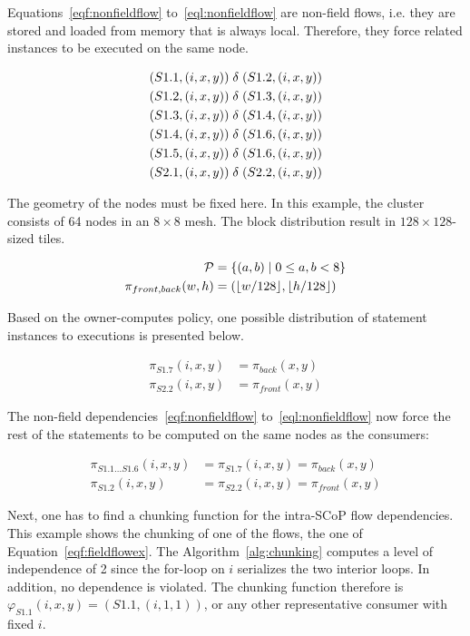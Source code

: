 \documentclass{sigplanconf}
\newcommand{\Proc}{{\cal P}}
\begin{document}
Equations~\ref{eqf:nonfieldflow} to~\ref{eql:nonfieldflow} are non-field flows, i.e. they are stored and loaded from memory that is always local. Therefore, they force  related instances to be executed on the same node.

\begin{align}
  (S1.1,(i,x,y)) &\;\delta\; (S1.2,(i,x,y)) \label{eqf:nonfieldflow}\\
  (S1.2,(i,x,y)) &\;\delta\; (S1.3,(i,x,y))\\
  (S1.3,(i,x,y)) &\;\delta\; (S1.4,(i,x,y))\\
  (S1.4,(i,x,y)) &\;\delta\; (S1.6,(i,x,y))\\
  (S1.5,(i,x,y)) &\;\delta\; (S1.6,(i,x,y))\\
  (S2.1,(i,x,y)) &\;\delta\; (S2.2,(i,x,y)) \label{eql:nonfieldflow}
\end{align}
 

The geometry of the nodes must be fixed here. In this example, the cluster consists of 64 nodes in an $8 \times 8$ mesh. The block distribution result in $128 \times 128$-sized tiles.

\begin{align}
  \Proc &= \{ (a,b) \mid 0 \le a,b < 8 \} \notag\\
  \pi_{front,back}(w,h) &= (\lfloor w/128 \rfloor,\lfloor h/128 \rfloor) \label{eq:pifield}
\end{align}


Based on the owner-computes policy, one possible distribution of statement instances to executions is presented below.

\begin{align*}
  \pi_{S1.7}(i,x,y) &= \pi_{back}(x,y)\\
  \pi_{S2.2}(i,x,y) &= \pi_{front}(x,y)
\end{align*}

The non-field dependencies~\ref{eqf:nonfieldflow} to~\ref{eql:nonfieldflow} now force the rest of the statements to be computed on the same nodes as the consumers:

\begin{align*}
  \pi_{S1.1 \dots S1.6}(i,x,y) &= \pi_{S1.7}(i,x,y) = \pi_{back}(x,y)\\
  \pi_{S1.2}(i,x,y) &= \pi_{S2.2}(i,x,y) = \pi_{front}(x,y)
\end{align*}

Next, one has to find a chunking function for the intra-SCoP flow dependencies. This example shows the chunking of one of the flows, the one of Equation~\ref{eqf:fieldflowex}. The Algorithm~\ref{alg:chunking} computes a level of independence of 2 since the for-loop on $i$ serializes the two interior loops. In addition, no dependence is violated. The chunking function therefore is $\varphi_{S1.1}(i,x,y) = (S1.1, (i,1,1))$, or any other representative consumer with fixed $i$.
\end{document}

